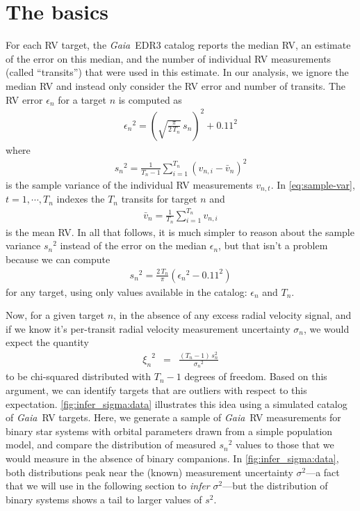 \documentclass[modern, letterpaper]{aastex631}
\newcommand{\project}[1]{\textsl{#1}}
\newcommand{\Gaia}{\project{Gaia}}
\begin{document}
\section{The basics}
\label{sect:basics}

For each RV target, the \Gaia\ EDR3 catalog reports the median RV, an estimate of the error on this median, and the number of individual RV measurements (called ``transits'') that were used in this estimate.
In our analysis, we ignore the median RV and instead only consider the RV error and number of transits.
The RV error $\epsilon_n$ for a target $n$ is computed as \citep{Katz19}
\begin{eqnarray}
	{\epsilon_n}^2 = \left(\sqrt{\frac{\pi}{2\,T_n}}\,s_n\right)^2 + 0.11^2
\end{eqnarray}
where
\begin{eqnarray}
	\label{eq:sample-var}
	{s_n}^2 = \frac{1}{T_n-1}\sum_{i=1}^{T_n} \left(v_{n,i} - \bar{v}_n\right)^2
\end{eqnarray}
is the sample variance of the individual RV measurements $v_{n,t}$.
In \autoref{eq:sample-var}, $t=1,\cdots,T_n$ indexes the $T_n$ transits for target $n$ and
\begin{eqnarray}
	\bar{v}_n = \frac{1}{T_n}\sum_{i=1}^{T_n} v_{n,i}
\end{eqnarray}
is the mean RV.
In all that follows, it is much simpler to reason about the sample variance ${s_n}^2$ instead of the error on the median ${\epsilon}_n$, but that isn't a problem because we can compute
\begin{eqnarray}
	{s_n}^2 = \frac{2\,T_n}{\pi}\left({\epsilon_n}^2 - 0.11^2\right)
\end{eqnarray}
for any target, using only values available in the catalog: $\epsilon_n$ and $T_n$.

Now, for a given target $n$, in the absence of any excess radial velocity signal, and if we know it's per-transit radial velocity measurement uncertainty $\sigma_n$, we would expect the quantity
\begin{eqnarray}
	{\xi_n}^2 &=& \frac{(T_n - 1)\,s_n^2}{{\sigma_n}^2}
	\label{eq:chi-sq-samp}
\end{eqnarray}
to be chi-squared distributed with $T_n - 1$ degrees of freedom.
Based on this argument, we can identify targets that are outliers with respect to this expectation.
\autoref{fig:infer_sigma:data} illustrates this idea using a simulated catalog of \Gaia\ RV targets.
Here, we generate a sample of \Gaia\ RV measurements for binary star systems with orbital parameters drawn from a simple population model, and compare the distribution of measured ${s_n}^2$ values to those that we would measure in the absence of binary companions.
In \autoref{fig:infer_sigma:data}, both distributions peak near the (known) measurement uncertainty $\sigma^2$---a fact that we will use in the following section to \emph{infer} $\sigma^2$---but the distribution of binary systems shows a tail to larger values of $s^2$.
\end{document}
